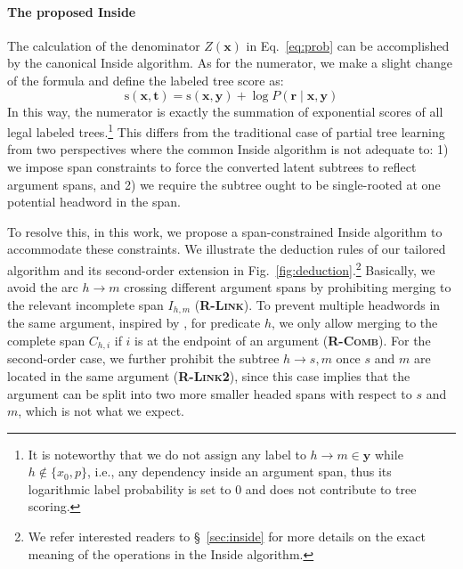 \documentclass[11pt]{article}
\begin{document}
\paragraph{The proposed Inside}
The calculation of the denominator $Z(\boldsymbol{x})$ in Eq.~\ref{eq:prob} can be accomplished by the canonical Inside algorithm.
As for the numerator, we make a slight change of the formula and define the labeled tree score as:
\begin{equation}
    \mathrm{s}(\boldsymbol{x},\boldsymbol{t})=\mathrm{s}(\boldsymbol{x},\boldsymbol{y})+ \log P(\boldsymbol{r}\mid \boldsymbol{x},\boldsymbol{y})
\end{equation}
In this way, the numerator is exactly the summation of exponential scores of all legal labeled trees.\footnote{
    It is noteworthy that we do not assign any label to $h\rightarrow m \in \boldsymbol{y}$ while $h\notin \{x_0,p\}$, i.e., any dependency inside an argument span, thus its logarithmic label probability is set to 0 and does not contribute to tree scoring.
}
This differs from the traditional case of partial tree learning \cite{li-etal-2016-active} from two perspectives where the common Inside algorithm is not adequate to: 1) we impose span constraints to force the converted latent subtrees to reflect argument spans, and 2) we require the subtree ought to be single-rooted at one potential headword in the span.

To resolve this, in this work, we propose a span-constrained Inside algorithm to accommodate these constraints.
We illustrate the deduction rules \cite{pereira-warren-1983-parsing} of our tailored algorithm and its second-order extension in Fig.~\ref{fig:deduction}.\footnote{We refer interested readers to \S~\ref{sec:inside} for more details on the exact meaning of the operations in the Inside algorithm.}
Basically, we avoid the arc $h\rightarrow m$ crossing different argument spans by prohibiting merging to the relevant incomplete span $I_{h, m}$ (\textbf{\textsc{R-Link}}).
To prevent multiple headwords in the same argument, inspired by \citet{zhang-etal-2021-adapting}, for predicate $h$, we only allow merging to the complete span $C_{h, i}$ if $i$ is at the endpoint of an argument (\textbf{\textsc{R-Comb}}).
For the second-order case, we further prohibit the subtree $h\rightarrow s,m$ once $s$ and $m$ are located in the same argument (\textbf{\textsc{R-Link2}}), since this case implies that the argument can be split into two more smaller headed spans with respect to $s$ and $m$, which is not what we expect.
\end{document}
